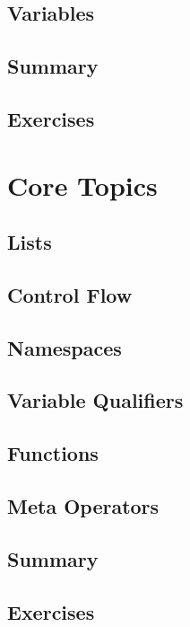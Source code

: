 \documentclass[oneside]{book}
\begin{document}
\section{Variables}
\blindtext

\section{Summary}
\blindtext

\section{Exercises}
\blindtext

\chapter{Core Topics}
\blindtext

\section{Lists}

\section{Control Flow}
\blindtext

\section{Namespaces}
\blindtext

\section{Variable Qualifiers}
\blindtext

\section{Functions}
\blindtext

\section{Meta Operators}
\blindtext

\section{Summary}
\blindtext

\section{Exercises}
\blindtext
\end{document}

